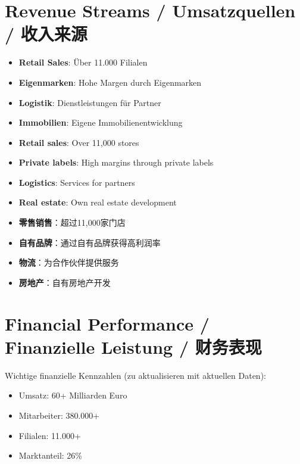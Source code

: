 \section{Revenue Streams / Umsatzquellen / 收入来源}

\begin{otherlanguage}{ngerman}
\begin{itemize}
    \item \textbf{Retail Sales}: Über 11.000 Filialen
    \item \textbf{Eigenmarken}: Hohe Margen durch Eigenmarken
    \item \textbf{Logistik}: Dienstleistungen für Partner
    \item \textbf{Immobilien}: Eigene Immobilienentwicklung
\end{itemize}
\end{otherlanguage}

\begin{itemize}
    \item \textbf{Retail sales}: Over 11,000 stores
    \item \textbf{Private labels}: High margins through private labels
    \item \textbf{Logistics}: Services for partners
    \item \textbf{Real estate}: Own real estate development
\end{itemize}

\begin{itemize}
    \item \textbf{零售销售}：超过11,000家门店
    \item \textbf{自有品牌}：通过自有品牌获得高利润率
    \item \textbf{物流}：为合作伙伴提供服务
    \item \textbf{房地产}：自有房地产开发
\end{itemize}

\section{Financial Performance / Finanzielle Leistung / 财务表现}

\begin{otherlanguage}{ngerman}
Wichtige finanzielle Kennzahlen (zu aktualisieren mit aktuellen Daten):
\begin{itemize}
    \item Umsatz: 60+ Milliarden Euro
    \item Mitarbeiter: 380.000+
    \item Filialen: 11.000+
    \item Marktanteil: 26\%
\end{itemize}
\end{otherlanguage}

